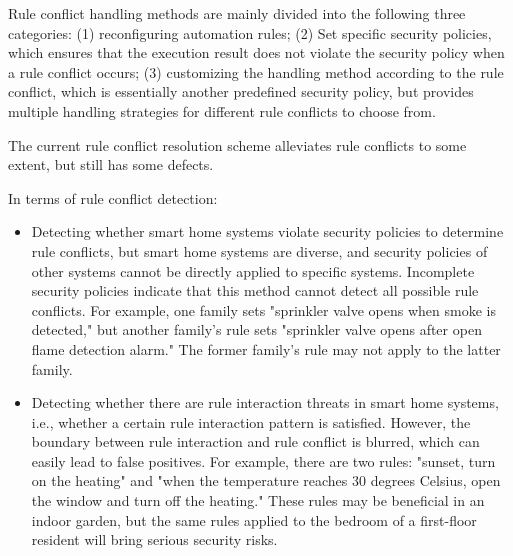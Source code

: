 Rule conflict handling methods are mainly divided into the following three categories: 
(1) reconfiguring automation rules; 
(2) Set specific security policies, which ensures that the execution result does not violate the security policy when a rule conflict occurs; 
(3) customizing the handling method according to the rule conflict, which is essentially another predefined security policy, but provides multiple handling strategies for different rule conflicts to choose from.

The current rule conflict resolution scheme alleviates rule conflicts to some extent, but still has some defects.

In terms of rule conflict detection:

\begin{itemize}
	\item Detecting whether smart home systems violate security policies to determine rule conflicts, but smart home systems are diverse, and security policies of other systems cannot be directly applied to specific systems. Incomplete security policies indicate that this method cannot detect all possible rule conflicts. For example, one family sets "sprinkler valve opens when smoke is detected," but another family's rule sets "sprinkler valve opens after open flame detection alarm." The former family's rule may not apply to the latter family.
	
	\item Detecting whether there are rule interaction threats in smart home systems, i.e., whether a certain rule interaction pattern is satisfied. However, the boundary between rule interaction and rule conflict is blurred, which can easily lead to false positives. For example, there are two rules: "sunset, turn on the heating" and "when the temperature reaches 30 degrees Celsius, open the window and turn off the heating." These rules may be beneficial in an indoor garden, but the same rules applied to the bedroom of a first-floor resident will bring serious security risks.
\end{itemize}

